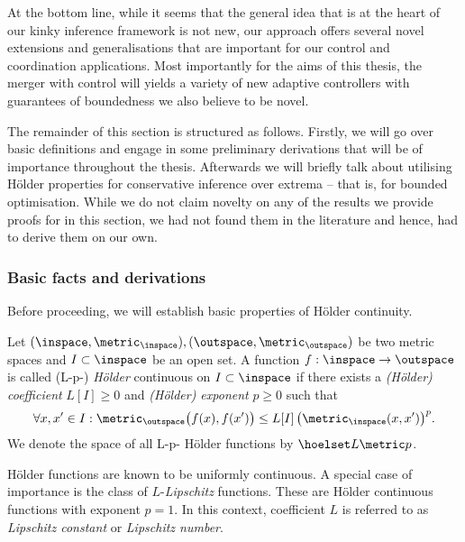 At the bottom line, while it seems that the general idea that is at the heart of our kinky inference framework is not new, our approach offers several novel extensions and generalisations that are important for our 
control and coordination applications. Most importantly for the aims of this thesis, the merger with control will yields a variety of new adaptive controllers with guarantees of boundedness we also believe to be novel.

The remainder of this section is structured as follows. Firstly, we will go over basic definitions and engage in some preliminary derivations that will be of importance throughout the thesis.
Afterwards we will briefly talk about utilising H\"older properties for conservative inference over extrema -- that is, for bounded optimisation. While we do not claim novelty on any of the results we provide proofs for in this section, we had not found them in the literature and hence, had to derive them on our own.

\subsubsection{Basic facts and derivations}
Before proceeding, we will establish basic properties of H\"older continuity. 

\begin{defn} 
Let $(\inspace ,\metric_\inspace ), (\outspace , \metric_\outspace )$ be two metric spaces and 
$I \subset \inspace$ be an open set. A function $f: \inspace \to \outspace $ is called (L-p-) \emph{H\"older} 
continuous on $I \subset \inspace$ if there exists a \emph{(H\"older) coefficient} $L[I] \geq 0$ and \emph{(H\"older) 
exponent} $p\geq 0$ such that 
\[\forall x,x' \in I : \metric_\outspace \bigl(f(x),f(x')\bigr) \leq L[I] \, \bigl( \metric_\inspace (x,x') \bigr)^p. \]
We denote the space of all L-p- H\"older functions by $\hoelset L \metric p$.
 \end{defn}
H\"older functions are known to be uniformly continuous. 
A special case of importance is the class of $L$-\textit{Lipschitz} functions. These are H\"older continuous 
functions with exponent $p=1$. In this context, coefficient $L$ is referred to as\textit{ Lipschitz constant} or \textit{Lipschitz number}.

